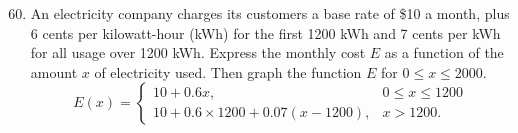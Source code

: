 \documentclass{article}
\begin{document}
\begin{enumerate}
\setcounter{enumi}{59}
  \item An electricity company charges its customers a base rate of \$10 a month, plus 6 cents per kilowatt-hour (kWh) for the first 1200 kWh and 7 cents per kWh for all usage over 1200 kWh. Express the monthly cost $E$ as a function of the amount $x$ of electricity used. Then graph the function $E$ for $0\leq x \leq 2000$.
  		\newline
  		$$E(x)=\begin{cases} 
      		10+0.6x, & 0\leq x\leq 1200 \\
      		10+0.6\times 1200 + 0.07(x-1200), & x > 1200.
   		\end{cases}$$
 		\newline 
 		\begin{center}
 		\pgfplotsset{compat=1.6,width=0.5\linewidth,height=6cm}
		 
		\end{center}
   		

\end{enumerate}
\end{document}
